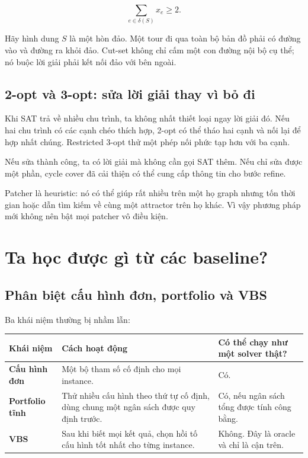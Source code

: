 \documentclass[11pt,a4paper,oneside]{scrreprt}
\begin{document}
\[
  \sum_{e\in\delta(S)} x_e \geq 2.
\]

\begin{intuitionbox}
Hãy hình dung $S$ là một hòn đảo. Một tour đi qua toàn bộ bản đồ phải có đường vào và đường ra khỏi đảo. Cut-set không chỉ cấm một con đường nội bộ cụ thể; nó buộc lời giải phải kết nối đảo với bên ngoài.
\end{intuitionbox}

\section{2-opt và 3-opt: sửa lời giải thay vì bỏ đi}

Khi SAT trả về nhiều chu trình, ta không nhất thiết loại ngay lời giải đó. Nếu hai chu trình có các cạnh chéo thích hợp, 2-opt có thể tháo hai cạnh và nối lại để hợp nhất chúng. Restricted 3-opt thử một phép nối phức tạp hơn với ba cạnh.

Nếu sửa thành công, ta có lời giải mà không cần gọi SAT thêm. Nếu chỉ sửa được một phần, cycle cover đã cải thiện có thể cung cấp thông tin cho bước refine.

\begin{warningbox}
Patcher là heuristic: nó có thể giúp rất nhiều trên một họ graph nhưng tốn thời gian hoặc dẫn tìm kiếm về cùng một attractor trên họ khác. Vì vậy phương pháp mới không nên bật mọi patcher vô điều kiện.
\end{warningbox}

\chapter{Ta học được gì từ các baseline?}

\section{Phân biệt cấu hình đơn, portfolio và VBS}

Ba khái niệm thường bị nhầm lẫn:

\begin{tabularx}{\textwidth}{>{\bfseries\sffamily}p{31mm} X X}
\toprule
Khái niệm & Cách hoạt động & Có thể chạy như một solver thật? \\
\midrule
Cấu hình đơn & Một bộ tham số cố định cho mọi instance. & Có. \\
Portfolio tĩnh & Thử nhiều cấu hình theo thứ tự cố định, dùng chung một ngân sách được quy định trước. & Có, nếu ngân sách tổng được tính công bằng. \\
VBS & Sau khi biết mọi kết quả, chọn hồi tố cấu hình tốt nhất cho từng instance. & Không. Đây là oracle và chỉ là cận trên. \\
\bottomrule
\end{tabularx}
\end{document}
